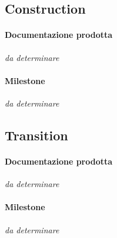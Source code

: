 \subsection{Construction}

\paragraph{Documentazione prodotta}
\emph{da determinare}

\paragraph{Milestone}
\emph{da determinare}


\subsection{Transition}

\paragraph{Documentazione prodotta}
\emph{da determinare}

\paragraph{Milestone}
\emph{da determinare}
